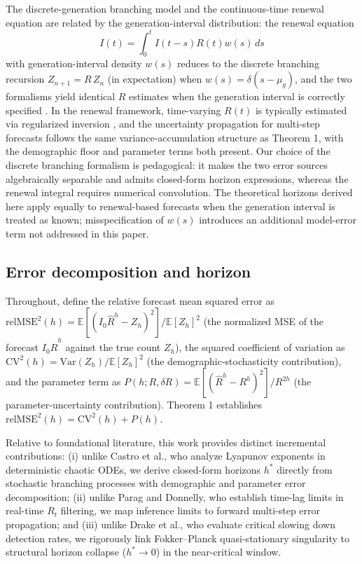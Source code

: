 \documentclass[review]{elsarticle}
\theoremstyle{plain}
\theoremstyle{definition}
\begin{document}
The discrete-generation branching model and the continuous-time renewal equation \citep{wallinga2004different} are related by the generation-interval distribution: the renewal equation
\begin{equation}
I(t) = \int_0^t I(t-s) R(t) w(s) \, ds
\end{equation}
with generation-interval density $w(s)$ reduces to the discrete branching recursion $Z_{n+1} = R \, Z_n$ (in expectation) when $w(s) = \delta(s - \mu_g)$, and the two formalisms yield identical $R$ estimates when the generation interval is correctly specified \citep{wallinga2007generation}. In the renewal framework, time-varying $R(t)$ is typically estimated via regularized inversion \citep{cori2013framework}, and the uncertainty propagation for multi-step forecasts follows the same variance-accumulation structure as Theorem 1, with the demographic floor and parameter terms both present. Our choice of the discrete branching formalism is pedagogical: it makes the two error sources algebraically separable and admits closed-form horizon expressions, whereas the renewal integral requires numerical convolution. The theoretical horizons derived here apply equally to renewal-based forecasts when the generation interval is treated as known; misspecification of $w(s)$ introduces an additional model-error term not addressed in this paper.


\subsection{Error decomposition and horizon}

 Throughout, define the relative forecast mean squared error as $\text{relMSE}^2(h) = \mathbb{E}[(I_0 \hat{R}^h - Z_h)^2]/\mathbb{E}[Z_h]^2$ (the normalized MSE of the forecast $I_0 \hat{R}^h$ against the true count $Z_h$), the squared coefficient of variation as $\text{CV}^2(h) = \text{Var}(Z_h)/\mathbb{E}[Z_h]^2$ (the demographic-stochasticity contribution), and the parameter term as $P(h; R, \delta R) = \mathbb{E}[(\hat{R}^h - R^h)^2]/R^{2h}$ (the parameter-uncertainty contribution). Theorem 1 establishes $\text{relMSE}^2(h) = \text{CV}^2(h) + P(h)$.

Relative to foundational literature, this work provides distinct incremental contributions: (i) unlike Castro et al.\citep{castro2020predictability}, who analyze Lyapunov exponents in deterministic chaotic ODEs, we derive closed-form horizons $h^*$ directly from stochastic branching processes with demographic and parameter error decomposition; (ii) unlike Parag and Donnelly\citep{parag2022fundamental}, who establish time-lag limits in real-time $R_t$ filtering, we map inference limits to forward multi-step error propagation; and (iii) unlike Drake et al.\citep{drake2019early}, who evaluate critical slowing down detection rates, we rigorously link Fokker--Planck quasi-stationary singularity to structural horizon collapse ($h^* \to 0$) in the near-critical window.
\end{document}
